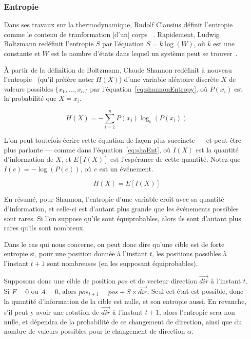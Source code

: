 	\subsubsection{Entropie}
	Dans ses travaux sur la thermodynamique, Rudolf Clausius définit l'entropie comme \og le contenu de tranformation [d'un] corps \fg{}~\cite{clausius1865verschiedene, clausius1865diverses}. Rapidement, Ludwig Boltzmann redéfinit l'entropie $S$ par l'équation $S = k\log(W)$, où $k$ est une constante et $W$ est le nombre d'états dans lequel un système peut se trouver~\cite{boltzmann1866mechanische, weisstein2004eric}.
	
	À partir de la définition de Boltzmann, Claude Shannon redéfinit à nouveau l'entropie~\cite{shannon1949communication} (qu'il préfère noter $H(X)$) d'une variable aléatoire discrète $X$ de valeurs possibles $\{x_{1}, \ldots{}, x_{n}\}$ par l'équation~\ref{eq:shannonEntropy}, où $P(x_{i})$ est la probabilité que $X=x_{i}$.
	
	\begin{equation}
		\label{eq:shannonEntropy}
		H(X) = -\sum_{i=1}^{n}P(x_{i})\log_{b}\left(P(x_{i})\right)
	\end{equation}
	
	L'on peut toutefois écrire cette équation de façon plus succincte --- et peut-être plus parlante --- comme dans l'équation~\ref{eq:shaEnt}, où $I(X)$ est la quantité d'information de $X$, et $E[I(X)]$ est l'espérance de cette quantité. Notez que $I(e) = -\log\left(P(e)\right)$, où $e$ est un événement.
	
	\begin{equation}
		\label{eq:shaEnt}
		H(X) = E[I(X)]
	\end{equation}
	
	En résumé, pour Shannon, l'entropie d'une variable croît avec sa quantité d'information, et celle-ci est d'autant plus grande que les événements possibles sont rares. Si l'on suppose qu'ils sont équiprobables, alors ils sont d'autant plus rares qu'ils sont nombreux.
	
	Dans le cas qui nous concerne, on peut donc dire qu'une cible est de forte entropie si, pour une position donnée à l'instant $t$, les positions possibles à l'instant $t+1$ sont nombreuses (en les supposant équiprobables).
	
	Supposons donc une cible de position $pos$ et de vecteur direction $\vec{dir}$ à l'instant $t$. Si $F=0$ ou $A=0$, alors $pos_{t+1} = pos + S \times \vec{dir}$. Seul cet état est possible, donc la quantité d'information de la cible est nulle, et son entropie aussi. En revanche, s'il peut y avoir une rotation de $\vec{dir}$ à l'instant $t+1$, alors l'entropie sera non nulle, et dépendra de la probabilité de ce changement de direction, ainsi que du nombre de valeurs possibles pour le changement de direction $\alpha$.
	
